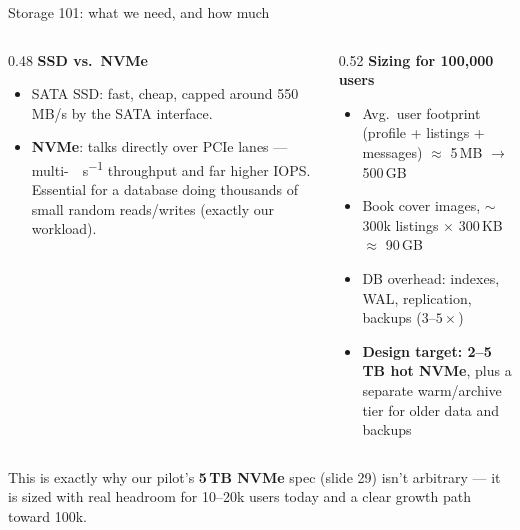 \documentclass[aspectratio=169,10pt]{beamer}
\newcommand{\eyebrow}[1]{{\small\color{sovGold}\textbf{#1}}}
\begin{document}
\begin{frame}{Storage 101: what we need, and how much}
  \begin{columns}[T]
    \begin{column}{0.48\textwidth}
      \eyebrow{SSD vs.\ NVMe}
      \begin{itemize}
        \item SATA SSD: fast, cheap, capped around 550\,MB/s by the SATA interface.
        \item \textbf{NVMe}: talks directly over PCIe lanes --- multi-\si{\giga\byte\per\second} throughput and far higher IOPS. Essential for a database doing thousands of small random reads/writes (exactly our workload).
      \end{itemize}
    \end{column}
    \begin{column}{0.52\textwidth}
      \eyebrow{Sizing for 100{,}000 users}
      \small
      \begin{itemize}
        \item Avg.\ user footprint (profile + listings + messages) $\approx$ 5\,MB $\rightarrow$ 500\,GB
        \item Book cover images, $\sim$300k listings $\times$ 300\,KB $\approx$ 90\,GB
        \item DB overhead: indexes, WAL, replication, backups ($3$--$5\times$)
        \item \textbf{Design target: 2--5\,TB hot NVMe}, plus a separate warm/archive tier for older data and backups
      \end{itemize}
    \end{column}
  \end{columns}
  \begin{takeaway}
   This is exactly why our pilot's \textbf{5\,TB NVMe} spec (slide 29) isn't arbitrary --- it is sized with real headroom for 10--20k users today and a clear growth path toward 100k.
  \end{takeaway}
\end{frame}
\end{document}
